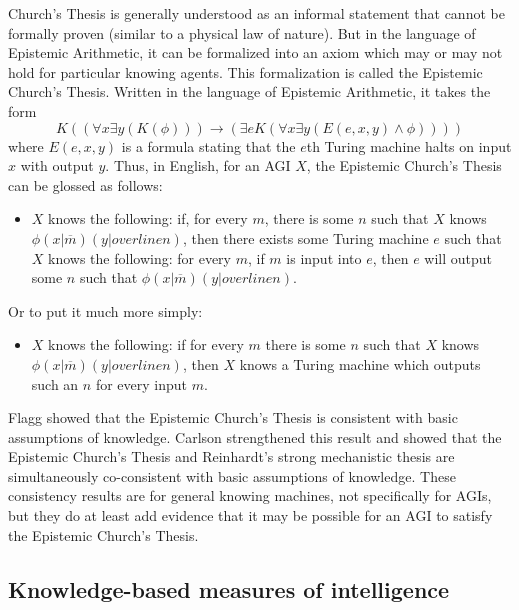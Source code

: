 \documentclass[runningheads]{llncs}
\begin{document}
Church's Thesis is generally understood as an informal statement that cannot
be formally proven (similar to a physical law of nature).
But in the language of Epistemic Arithmetic, it can be formalized into an
axiom which may or may not hold for particular knowing agents. This formalization
is called the Epistemic Church's Thesis. Written in the language of Epistemic
Arithmetic, it takes the form
\[
  K( ( \forall x\exists y (K(\phi))  ) \rightarrow
  ( \exists e K( \forall x\exists y ( E(e,x,y) \wedge \phi  )  )  )  )
\]
where $E(e,x,y)$ is a formula stating that the $e$th Turing machine
halts on input $x$ with output $y$.
Thus, in English, for an AGI $X$,
the Epistemic Church's Thesis can be glossed as follows:
\begin{itemize}
  \item
  $X$ knows the following: if, for every $m$, there is some $n$ such that
  $X$ knows $\phi(x|\overline m)(y|overline n)$, then there exists some
  Turing machine $e$ such that $X$ knows the following:
  for every $m$, if $m$ is input into $e$, then $e$ will output
  some $n$ such that $\phi(x|\overline m)(y|overline n)$.
\end{itemize}
Or to put it much more simply:
\begin{itemize}
  \item
  $X$ knows the following: if for every $m$ there is some $n$ such that
  $X$ knows $\phi(x|\overline m)(y|overline n)$, then $X$ knows a Turing
  machine which outputs such an $n$ for every input $m$.
\end{itemize}
Flagg showed \cite{flagg1985church} that the Epistemic Church's Thesis is
consistent with basic assumptions of knowledge. Carlson strengthened this
result and showed \cite{carlson2016collapsing} that the Epistemic Church's
Thesis and Reinhardt's strong mechanistic thesis are simultaneously
co-consistent with basic assumptions of knowledge.
These consistency results are for general knowing machines, not specifically
for AGIs, but they do at least add evidence that it may be possible for an
AGI to satisfy the Epistemic Church's Thesis.

\subsection{Knowledge-based measures of intelligence}
\end{document}
